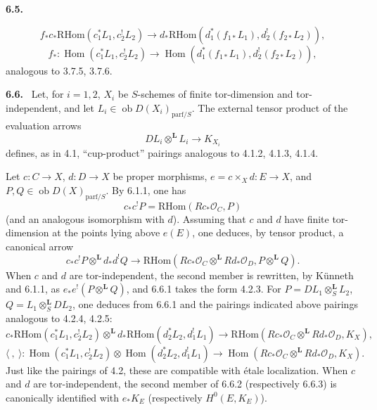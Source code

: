 \documentclass[11pt]{article}
\newenvironment{statement}[1]{\par\medskip\noindent\textbf{#1.}\ }{\par\medskip}
\DeclareMathOperator{\Hom}{Hom}
\newcommand{\ob}{\operatorname{ob}}
\providecommand{\RHom}{\mathrm{RHom}}
\providecommand{\parf}{\mathrm{parf}}
\providecommand{\LL}{\mathbf L}
\providecommand{\OO}{\mathcal O}
\begin{document}
\begin{statement}{6.5}

\begin{equation}
\tag{6.5.4}
f_*c_*\RHom(c_1^*L_1,c_2^!L_2)
\longrightarrow
d_*\RHom(d_1^*(f_{1*}L_1),d_2^!(f_{2*}L_2)),
\end{equation}
\begin{equation}
\tag{6.5.5}
f_*:\Hom(c_1^*L_1,c_2^!L_2)
\longrightarrow
\Hom(d_1^*(f_{1*}L_1),d_2^!(f_{2*}L_2)),
\end{equation}
analogous to 3.7.5, 3.7.6.
\end{statement}

\begin{statement}{6.6}
Let, for $i=1,2$, $X_i$ be $S$-schemes of finite tor-dimension and tor-independent, and let $L_i\in\ob D(X_i)_{\parf/S}$. The external tensor product of the evaluation arrows
\[
DL_i\otimes^{\LL}L_i\longrightarrow K_{X_i}
\]
defines, as in 4.1, ``cup-product'' pairings analogous to 4.1.2, 4.1.3, 4.1.4.

Let $c:C\to X$, $d:D\to X$ be proper morphisms, $e=c\times_X d:E\to X$, and $P,Q\in\ob D(X)_{\parf/S}$. By 6.1.1, one has
\[
c_*c^!P=\RHom(Rc_*\OO_C,P)
\]
(and an analogous isomorphism with $d$). Assuming that $c$ and $d$ have finite tor-dimension at the points lying above $e(E)$, one deduces, by tensor product, a canonical arrow
\begin{equation}
\tag{6.6.1}
c_*c^!P\otimes^{\LL}d_*d^!Q
\longrightarrow
\RHom(Rc_*\OO_C\otimes^{\LL}Rd_*\OO_D,P\otimes^{\LL}Q).
\end{equation}
When $c$ and $d$ are tor-independent, the second member is rewritten, by Künneth and 6.1.1, as $e_*e^!(P\otimes^{\LL}Q)$, and 6.6.1 takes the form 4.2.3. For $P=DL_1\otimes_S^{\LL}L_2$, $Q=L_1\otimes_S^{\LL}DL_2$, one deduces from 6.6.1 and the pairings indicated above pairings analogous to 4.2.4, 4.2.5:
\begin{equation}
\tag{6.6.2}
c_*\RHom(c_1^*L_1,c_2^!L_2)\otimes^{\LL}d_*\RHom(d_2^*L_2,d_1^!L_1)
\longrightarrow
\RHom(Rc_*\OO_C\otimes^{\LL}Rd_*\OO_D,K_X),
\end{equation}
\begin{equation}
\tag{6.6.3}
\langle\ ,\ \rangle:\Hom(c_1^*L_1,c_2^!L_2)\otimes\Hom(d_2^*L_2,d_1^!L_1)
\longrightarrow
\Hom(Rc_*\OO_C\otimes^{\LL}Rd_*\OO_D,K_X).
\end{equation}
Just like the pairings of 4.2, these are compatible with étale localization. When $c$ and $d$ are tor-independent, the second member of 6.6.2 (respectively 6.6.3) is canonically identified with $e_*K_E$ (respectively $H^0(E,K_E)$).
\end{statement}
\end{document}
